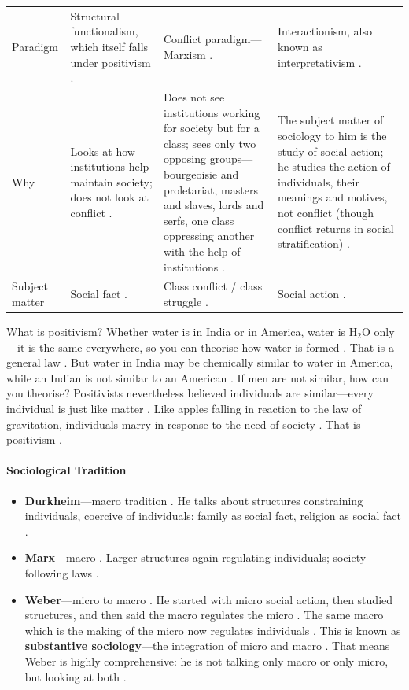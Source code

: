 \vspace{6pt}
\noindent
\begin{tabularx}{\textwidth}{>{\hsize}Y >{\hsize}Y >{\hsize}Y >{\hsize}Y}
\toprule
{}
 &  &  &  \\
\midrule
Paradigm & Structural functionalism, which itself falls under positivism . & Conflict paradigm---Marxism . & Interactionism, also known as interpretativism . \\
\midrule
Why & Looks at how institutions help maintain society; does not look at conflict . & Does not see institutions working for society but for a class; sees only two opposing groups---bourgeoisie and proletariat, masters and slaves, lords and serfs, one class oppressing another with the help of institutions . & The subject matter of sociology to him is the study of social action; he studies the action of individuals, their meanings and motives, not conflict (though conflict returns in social stratification) . \\
\midrule
Subject matter & Social fact . & Class conflict / class struggle . & Social action . \\
\bottomrule
\end{tabularx}
\vspace{6pt}

\begin{KeyConcept}
What is positivism? Whether water is in India or in America, water is $\text{H}_2\text{O}$ only---it is the same everywhere, so you can theorise how water is formed . That is a general law .
But water in India may be chemically similar to water in America, while an Indian is not similar to an American . If men are not similar, how can you theorise? Positivists nevertheless believed individuals are similar---every individual is just like matter .
Like apples falling in reaction to the law of gravitation, individuals marry in response to the need of society . That is positivism .
\end{KeyConcept}

\paragraph{Sociological Tradition}
\begin{itemize}
    \item \textbf{Durkheim}---macro tradition . He talks about structures constraining individuals, coercive of individuals: family as social fact, religion as social fact .
    \item \textbf{Marx}---macro . Larger structures again regulating individuals; society following laws .
    \item \textbf{Weber}---micro to macro . He started with micro social action, then studied structures, and then said the macro regulates the micro . The same macro which is the making of the micro now regulates individuals .
    This is known as \textbf{substantive sociology}---the integration of micro and macro . That means Weber is highly comprehensive: he is not talking only macro or only micro, but looking at both .
\end{itemize}

